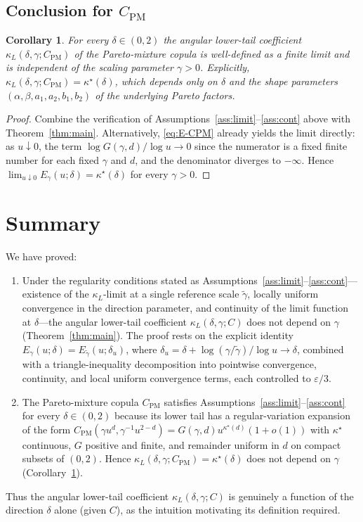 \documentclass[11pt]{article}
\newtheorem{corollary}[theorem]{Corollary}
\theoremstyle{definition}
\newcommand{\PM}{\mathrm{PM}}
\newcommand{\eps}{\varepsilon}
\begin{document}
\subsection{Conclusion for $C_{\PM}$}

\begin{corollary}\label{cor:pm}
For every $\delta\in(0,2)$ the angular lower-tail coefficient
$\kappa_L(\delta,\gamma;C_{\PM})$ of the Pareto-mixture copula is
well-defined as a finite limit and is independent of the scaling
parameter $\gamma>0$. Explicitly, $\kappa_L(\delta,\gamma;C_{\PM})=\kappa^\star(\delta)$,
which depends only on $\delta$ and the shape parameters
$(\alpha,\beta,a_1,a_2,b_1,b_2)$ of the underlying Pareto factors.
\end{corollary}

\begin{proof}
Combine the verification of
Assumptions~\ref{ass:limit}--\ref{ass:cont} above with
Theorem~\ref{thm:main}. Alternatively, \eqref{eq:E-CPM} already
yields the limit directly: as $u\downarrow 0$, the term
$\log G(\gamma,d)/\log u\to 0$ since the numerator is a fixed finite
number for each fixed $\gamma$ and $d$, and the denominator diverges to
$-\infty$. Hence $\lim_{u\downarrow 0}E_\gamma(u;\delta)=\kappa^\star(\delta)$ for
every $\gamma>0$.
\end{proof}

\section{Summary}

We have proved:
\begin{enumerate}[label=(\roman*),leftmargin=*]
\item Under the regularity conditions stated as
Assumptions~\ref{ass:limit}--\ref{ass:cont}---existence of the
$\kappa_L$-limit at a single reference scale $\tilde\gamma$, locally
uniform convergence in the direction parameter, and continuity of the
limit function at $\delta$---the angular lower-tail coefficient
$\kappa_L(\delta,\gamma;C)$ does not depend on $\gamma$
(Theorem~\ref{thm:main}). The proof rests on the explicit identity
$E_\gamma(u;\delta)=E_{\tilde\gamma}(u;\delta_u)$, where
$\delta_u=\delta+\log(\gamma/\tilde\gamma)/\log u\to\delta$, combined
with a triangle-inequality decomposition into pointwise convergence,
continuity, and local uniform convergence terms, each controlled to
$\eps/3$.
\item The Pareto-mixture copula $C_{\PM}$ satisfies
Assumptions~\ref{ass:limit}--\ref{ass:cont} for every $\delta\in(0,2)$
because its lower tail has a regular-variation expansion of the form
$C_{\PM}(\gamma u^{d},\gamma^{-1}u^{2-d})=G(\gamma,d)u^{\kappa^\star(d)}(1+o(1))$
with $\kappa^\star$ continuous, $G$ positive and finite, and remainder
uniform in $d$ on compact subsets of $(0,2)$. Hence
$\kappa_L(\delta,\gamma;C_{\PM})=\kappa^\star(\delta)$ does not depend
on $\gamma$ (Corollary~\ref{cor:pm}).
\end{enumerate}
Thus the angular lower-tail coefficient $\kappa_L(\delta,\gamma;C)$ is
genuinely a function of the direction $\delta$ alone (given $C$), as
the intuition motivating its definition required.
\end{document}
